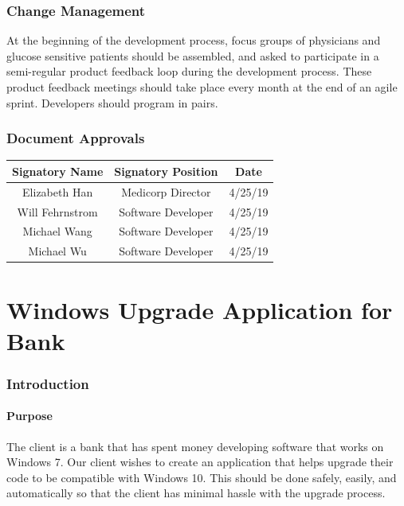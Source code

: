 \documentclass[12pt]{article}
\begin{document}
\section{Change Management}

At the beginning of the development process, focus groups of physicians and glucose sensitive patients should be
assembled, and asked to participate in a semi-regular product feedback loop during the development process. These
product feedback meetings should take place every month at the end of an agile sprint. Developers should program in pairs.

\section{Document Approvals}

\begin{center}
    \begin{tabular}{|c|c|c|}
        \hline
        Signatory Name & Signatory Position & Date \\ \hline
        Elizabeth Han & Medicorp Director & 4/25/19 \\ \hline
        Will Fehrnstrom & Software Developer & 4/25/19 \\ \hline
        Michael Wang & Software Developer & 4/25/19 \\ \hline
        Michael Wu & Software Developer & 4/25/19 \\ \hline
    \end{tabular}
\end{center}

\pagebreak
\part{Windows Upgrade Application for Bank}

\section{Introduction}

\subsection{Purpose}

The client is a bank that has spent money developing software that works on Windows 7. Our client
wishes to create an application that helps upgrade their code to be compatible with Windows 10.
This should be done safely, easily, and automatically so that the client has minimal hassle with the upgrade
process.
\end{document}
